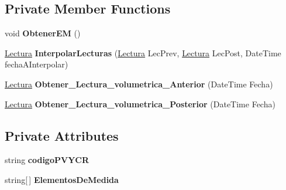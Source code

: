 \subsection*{Private Member Functions}
\begin{DoxyCompactItemize}
\item 
void {\bfseries Obtener\+EM} ()\hypertarget{class_sica_segura_1_1_s_i_c_a___punto_control_aeaec7c94240d1e8d67ba0cb5fb92eac5}{}\label{class_sica_segura_1_1_s_i_c_a___punto_control_aeaec7c94240d1e8d67ba0cb5fb92eac5}

\item 
\hyperlink{class_sica_segura_1_1_s_i_c_a___punto_control_1_1_lectura}{Lectura} {\bfseries Interpolar\+Lecturas} (\hyperlink{class_sica_segura_1_1_s_i_c_a___punto_control_1_1_lectura}{Lectura} Lec\+Prev, \hyperlink{class_sica_segura_1_1_s_i_c_a___punto_control_1_1_lectura}{Lectura} Lec\+Post, Date\+Time fecha\+A\+Interpolar)\hypertarget{class_sica_segura_1_1_s_i_c_a___punto_control_a8fe23db24b380334aae093374f59a828}{}\label{class_sica_segura_1_1_s_i_c_a___punto_control_a8fe23db24b380334aae093374f59a828}

\item 
\hyperlink{class_sica_segura_1_1_s_i_c_a___punto_control_1_1_lectura}{Lectura} {\bfseries Obtener\+\_\+\+Lectura\+\_\+volumetrica\+\_\+\+Anterior} (Date\+Time Fecha)\hypertarget{class_sica_segura_1_1_s_i_c_a___punto_control_ade125def28d40a3bfe6039cc6a2a6310}{}\label{class_sica_segura_1_1_s_i_c_a___punto_control_ade125def28d40a3bfe6039cc6a2a6310}

\item 
\hyperlink{class_sica_segura_1_1_s_i_c_a___punto_control_1_1_lectura}{Lectura} {\bfseries Obtener\+\_\+\+Lectura\+\_\+volumetrica\+\_\+\+Posterior} (Date\+Time Fecha)\hypertarget{class_sica_segura_1_1_s_i_c_a___punto_control_a0c0929ba6efda438e6040c1ddb983477}{}\label{class_sica_segura_1_1_s_i_c_a___punto_control_a0c0929ba6efda438e6040c1ddb983477}

\end{DoxyCompactItemize}
\subsection*{Private Attributes}
\begin{DoxyCompactItemize}
\item 
string {\bfseries codigo\+P\+V\+Y\+CR}\hypertarget{class_sica_segura_1_1_s_i_c_a___punto_control_aafab8ca2eb83a4e68d43f9d2b74c19fb}{}\label{class_sica_segura_1_1_s_i_c_a___punto_control_aafab8ca2eb83a4e68d43f9d2b74c19fb}

\item 
string\mbox{[}$\,$\mbox{]} {\bfseries Elementos\+De\+Medida}\hypertarget{class_sica_segura_1_1_s_i_c_a___punto_control_a63435f1782ec77457312fd6576875011}{}\label{class_sica_segura_1_1_s_i_c_a___punto_control_a63435f1782ec77457312fd6576875011}

\end{DoxyCompactItemize}



